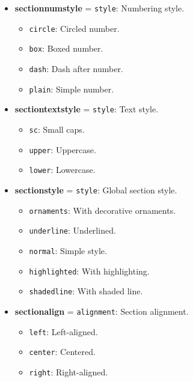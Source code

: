 \documentclass[
    margin=2cm
]{neoschool}
\begin{document}
\begin{itemize}
\item
  \textbf{sectionnumstyle} = \texttt{style}: Numbering
  style.

  \begin{itemize}
    \item
    \texttt{circle}: Circled number.
  \item
    \texttt{box}: Boxed number.
  \item
    \texttt{dash}: Dash after number.
  \item
    \texttt{plain}: Simple number.
  \end{itemize}
\item
  \textbf{sectiontextstyle} = \texttt{style}: Text
  style.

  \begin{itemize}
    \item
    \texttt{sc}: Small caps.
  \item
    \texttt{upper}: Uppercase.
  \item
    \texttt{lower}: Lowercase.
  \end{itemize}
\item
  \textbf{sectionstyle} = \texttt{style}: Global
  section style.

  \begin{itemize}
    \item
    \texttt{ornaments}: With decorative ornaments.
  \item
    \texttt{underline}: Underlined.
  \item
    \texttt{normal}: Simple style.
  \item
    \texttt{highlighted}: With highlighting.
  \item
    \texttt{shadedline}: With shaded line.
  \end{itemize}
\item
  \textbf{sectionalign} = \texttt{alignment}: Section
  alignment.

  \begin{itemize}
    \item
    \texttt{left}: Left-aligned.
  \item
    \texttt{center}: Centered.
  \item
    \texttt{right}: Right-aligned.
  \end{itemize}
\end{itemize}

\end{document}

